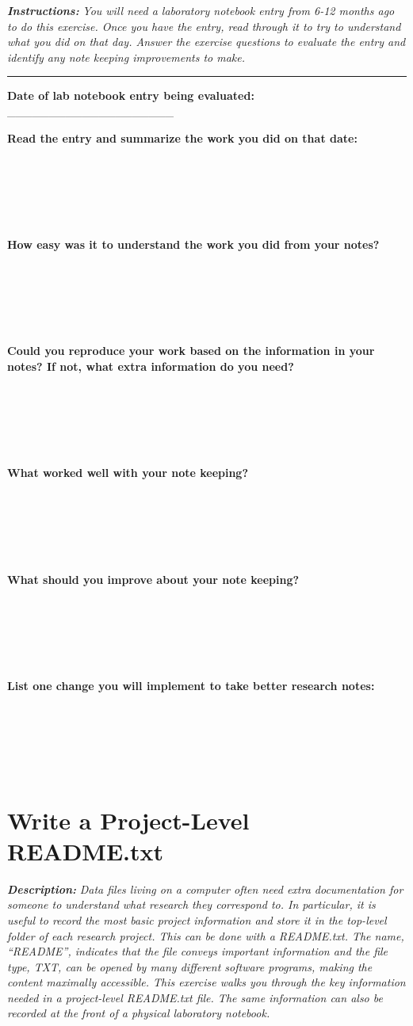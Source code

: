 \documentclass[
]{book}
\begin{document}
\textbf{\emph{Instructions:}} \emph{You will need a laboratory notebook entry from 6-12 months ago to do this exercise. Once you have the entry, read through it to try to understand what you did on that day. Answer the exercise questions to evaluate the entry and identify any note keeping improvements to make.}

\begin{center}\rule{0.5\linewidth}{0.5pt}\end{center}

\textbf{Date of lab notebook entry being evaluated:} \_\_\_\_\_\_\_\_\_\_\_\_\_\_\_\_\_\_\_\_

\textbf{Read the entry and summarize the work you did on that date:}

~

~

~

\textbf{How easy was it to understand the work you did from your notes?}

~

~

~

\textbf{Could you reproduce your work based on the information in your notes? If not, what extra information do you need?}

~

~

~

\textbf{What worked well with your note keeping?}

~

~

~

\textbf{What should you improve about your note keeping?}

~

~

~

\textbf{List one change you will implement to take better research notes:}

~

~

~

\newpage

\hypertarget{readme-txt}{%
\section{Write a Project-Level README.txt}\label{readme-txt}}

\textbf{\emph{Description:}} \emph{Data files living on a computer often need extra documentation for someone to understand what research they correspond to. In particular, it is useful to record the most basic project information and store it in the top-level folder of each research project. This can be done with a README.txt. The name, ``README'', indicates that the file conveys important information and the file type, TXT, can be opened by many different software programs, making the content maximally accessible. This exercise walks you through the key information needed in a project-level README.txt file. The same information can also be recorded at the front of a physical laboratory notebook.}
\end{document}
